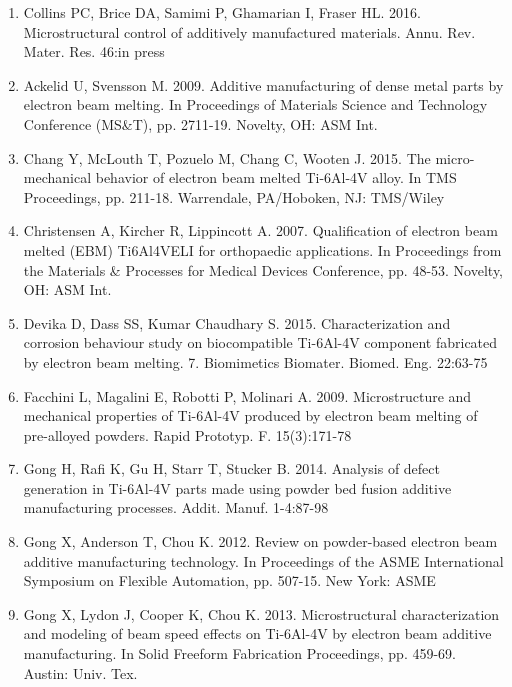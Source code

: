 \documentclass[10pt]{article}
\begin{document}
\begin{enumerate}
  \item Collins PC, Brice DA, Samimi P, Ghamarian I, Fraser HL. 2016. Microstructural control of additively manufactured materials. Annu. Rev. Mater. Res. 46:in press

  \item Ackelid U, Svensson M. 2009. Additive manufacturing of dense metal parts by electron beam melting. In Proceedings of Materials Science and Technology Conference (MS\&T), pp. 2711-19. Novelty, OH: ASM Int.

  \item Chang Y, McLouth T, Pozuelo M, Chang C, Wooten J. 2015. The micro-mechanical behavior of electron beam melted Ti-6Al-4V alloy. In TMS Proceedings, pp. 211-18. Warrendale, PA/Hoboken, NJ: TMS/Wiley

  \item Christensen A, Kircher R, Lippincott A. 2007. Qualification of electron beam melted (EBM) Ti6Al4VELI for orthopaedic applications. In Proceedings from the Materials \& Processes for Medical Devices Conference, pp. 48-53. Novelty, OH: ASM Int.

  \item Devika D, Dass SS, Kumar Chaudhary S. 2015. Characterization and corrosion behaviour study on biocompatible Ti-6Al-4V component fabricated by electron beam melting. 7. Biomimetics Biomater. Biomed. Eng. 22:63-75

  \item Facchini L, Magalini E, Robotti P, Molinari A. 2009. Microstructure and mechanical properties of Ti-6Al-4V produced by electron beam melting of pre-alloyed powders. Rapid Prototyp. F. 15(3):171-78

  \item Gong H, Rafi K, Gu H, Starr T, Stucker B. 2014. Analysis of defect generation in Ti-6Al-4V parts made using powder bed fusion additive manufacturing processes. Addit. Manuf. 1-4:87-98

  \item Gong X, Anderson T, Chou K. 2012. Review on powder-based electron beam additive manufacturing technology. In Proceedings of the ASME International Symposium on Flexible Automation, pp. 507-15. New York: ASME

  \item Gong X, Lydon J, Cooper K, Chou K. 2013. Microstructural characterization and modeling of beam speed effects on Ti-6Al-4V by electron beam additive manufacturing. In Solid Freeform Fabrication Proceedings, pp. 459-69. Austin: Univ. Tex.


\end{enumerate}
\end{document}

